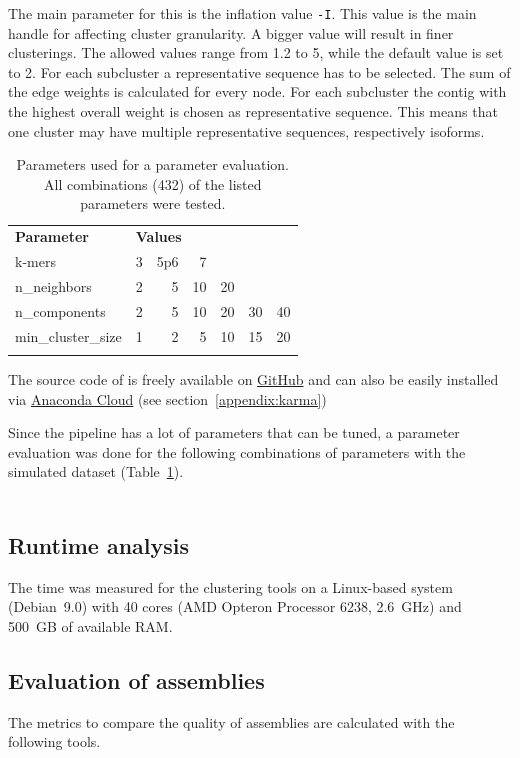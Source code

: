 \documentclass[12pt,a4paper,english]{article}
\begin{document}
	The main parameter for this is the inflation value \texttt{-I}. This value is the main handle for affecting cluster granularity. A bigger value will result in finer clusterings. The allowed values range from 1.2 to 5, while the default value is set to 2.
	For each subcluster a representative sequence has to be selected. The sum of the edge weights is calculated for every node. For each subcluster the contig with the highest overall weight is chosen as representative sequence. This means that one cluster may have multiple representative sequences, respectively isoforms.
	
	\begin{table}
		\caption[Combination of parameters.]{Parameters used for a parameter evaluation. All combinations (432) of the listed parameters were tested.}
		\label{table:comb}
		\begin{tabular}{lrrrrrr}
			\toprule
			\multicolumn{1}{l}{\textbf{Parameter}} & \multicolumn{5}{l}{\textbf{Values}} \\ \addlinespace
			\midrule
			k-mers & 3 & 5p6 & 7 &  &  &  \\ \addlinespace
			n\_neighbors & 2 & 5 & 10 & 20 &  &  \\ \addlinespace
			n\_components & 2 & 5 & 10 & 20 & 30 & 40 \\ \addlinespace
			min\_cluster\_size & 1 & 2 & 5 & 10 & 15 & 20 \\ \addlinespace
			\bottomrule
		\end{tabular}
	\end{table}
	
	The source code of \karma is freely available on \href{https://github.com/lmfaber/karma}{GitHub} and can also be easily installed via \href{https://anaconda.org/lmfaber/karma}{Anaconda Cloud} (see section~\ref{appendix:karma})
	
	Since the pipeline has a lot of parameters that can be tuned, a parameter evaluation was done for the following combinations of parameters with the simulated dataset (Table~\ref{table:comb}).\\
	\\
\subsection{Runtime analysis}
The time was measured for the clustering tools on a Linux-based system (Debian~9.0) with 40 cores (AMD Opteron Processor 6238, 2.6~GHz) and 500~GB of available RAM.

\subsection{Evaluation of assemblies}
	\label{ssec:evaluation}
	The metrics to compare the quality of assemblies are calculated with the following tools.
\end{document}

